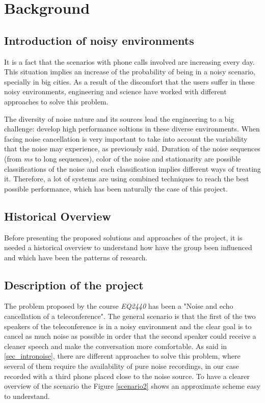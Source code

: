 \documentclass[11pt,a4paper,spanish]{book}  %
\theoremstyle{definition}  %
\theoremstyle{plain}  %
\theoremstyle{remark}  %
\begin{document}
\pagebreak\tableofcontents
\pagebreak

\chapter{Background}

	\section{Introduction of noisy environments}
	\label{sec:intronoise}
	
It is a fact that the scenarios with phone calls involved are increasing every day. This situation implies an increase of the probability of being in a noisy scenario, specially in big cities. As a result of the discomfort that the users suffer in these noisy environments, engineering and science have worked with different approaches to solve this problem.

The diversity of noise nature and its sources lead the engineering to a big challenge: develop high performance soltions in these diverse environments. When facing noise cancellation is very important to take into account the variability that the noise may experience, as previously said. Duration of the noise sequences (from \textit{ms} to long sequences), color of the noise and stationarity are possible classifications of the noise and each classification implies different ways of treating it. Therefore, a lot of systems are using combined techniques to reach the best possible performance, which has been naturally the case of this project.

	\section{Historical Overview}
	\label{historya}
	Before presenting the proposed solutions and approaches of the project, it is needed a historical overview to understand how have the group been influenced and which have been the patterns of research.


	\section{Description of the project}
	\label{sec:introproblem}
	
	The problem proposed by the course \textit{EQ2440} has been a "Noise and echo cancellation of a teleconference". The general scenario is that the first of the two speakers of the teleconference is in a noisy environment and the clear goal is to cancel as much noise as possible in order that the second speaker could receive a cleaner speech and make the conversation more comfortable. As said in \ref{sec_intronoise}, there are different approaches to solve this problem, where several of them require the availability of pure noise recordings, in our case recorded with a third phone placed close to the noise source. To have a clearer overview of the scenario the Figure \ref{scenario2} shows an approximate scheme easy to understand.
	
\end{document}
